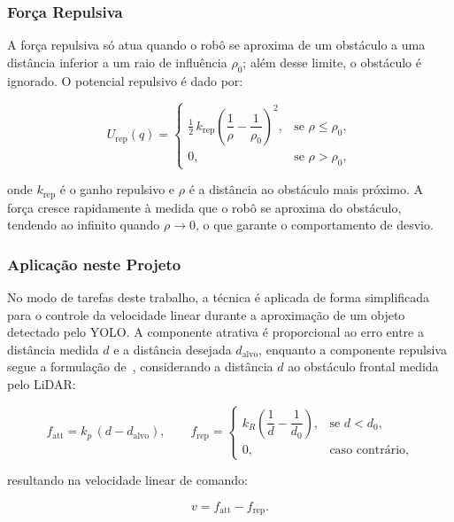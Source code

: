 \subsubsection{Força Repulsiva}

A força repulsiva só atua quando o robô se aproxima de um obstáculo a uma
distância inferior a um raio de influência $\rho_0$; além desse limite, o
obstáculo é ignorado. O potencial repulsivo é dado por:

\begin{equation}
  \label{eq:repulsivo}
  U_{\text{rep}}(q) =
  \begin{cases}
    \tfrac{1}{2}\, k_{\text{rep}}
      \left( \dfrac{1}{\rho} - \dfrac{1}{\rho_0} \right)^2, & \text{se } \rho \le \rho_0, \\[2ex]
    0, & \text{se } \rho > \rho_0,
  \end{cases}
\end{equation}

onde $k_{\text{rep}}$ é o ganho repulsivo e $\rho$ é a distância ao obstáculo mais
próximo. A força cresce rapidamente à medida que o robô se aproxima do obstáculo,
tendendo ao infinito quando $\rho \to 0$, o que garante o comportamento de desvio.

\subsubsection{Aplicação neste Projeto}

No modo de tarefas deste trabalho, a técnica é aplicada de forma simplificada
para o controle da velocidade linear durante a aproximação de um objeto detectado
pelo YOLO. A componente atrativa é proporcional ao erro entre a distância medida
$d$ e a distância desejada $d_{\text{alvo}}$, enquanto a componente repulsiva
segue a formulação de~\cite{khatib1986potential}, considerando a distância $d$ ao
obstáculo frontal medida pelo LiDAR:

\begin{equation}
  f_{\text{att}} = k_{p}\, (d - d_{\text{alvo}}), \qquad
  f_{\text{rep}} =
  \begin{cases}
    k_{R} \left( \dfrac{1}{d} - \dfrac{1}{d_0} \right), & \text{se } d < d_0, \\[2ex]
    0, & \text{caso contrário},
  \end{cases}
\end{equation}

resultando na velocidade linear de comando:

\begin{equation}
  v = f_{\text{att}} - f_{\text{rep}} .
\end{equation}

